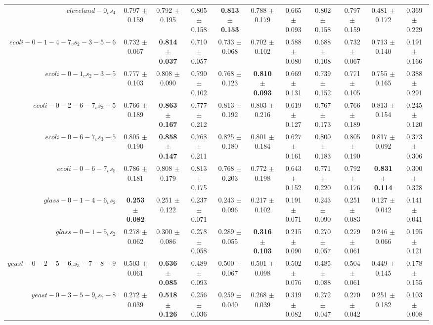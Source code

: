 \begin{table}[!ht]
{\begin{tabular}{r c c c c c c c c c c}
$cleveland-0_vs_4$ & 0.797 $\pm$ 0.159 & 0.792 $\pm$ 0.195 & 0.805 $\pm$ 0.158 & \textbf{0.813 $\pm$ 0.153} & 0.788 $\pm$ 0.179 & 0.665 $\pm$ 0.093 & 0.802 $\pm$ 0.158 & 0.797 $\pm$ 0.159 & 0.481 $\pm$ 0.172 & 0.369 $\pm$ 0.229 \\
$ecoli-0-1-4-7_vs_2-3-5-6$ & 0.732 $\pm$ 0.067 & \textbf{0.814 $\pm$ 0.037} & 0.710 $\pm$ 0.057 & 0.733 $\pm$ 0.068 & 0.702 $\pm$ 0.102 & 0.588 $\pm$ 0.080 & 0.688 $\pm$ 0.108 & 0.732 $\pm$ 0.067 & 0.713 $\pm$ 0.140 & 0.191 $\pm$ 0.166 \\
$ecoli-0-1_vs_2-3-5$ & 0.777 $\pm$ 0.103 & 0.808 $\pm$ 0.090 & 0.790 $\pm$ 0.102 & 0.768 $\pm$ 0.123 & \textbf{0.810 $\pm$ 0.093} & 0.669 $\pm$ 0.131 & 0.739 $\pm$ 0.152 & 0.771 $\pm$ 0.105 & 0.755 $\pm$ 0.165 & 0.388 $\pm$ 0.291 \\
$ecoli-0-2-6-7_vs_3-5$ & 0.766 $\pm$ 0.189 & \textbf{0.863 $\pm$ 0.167} & 0.777 $\pm$ 0.212 & 0.813 $\pm$ 0.192 & 0.803 $\pm$ 0.216 & 0.619 $\pm$ 0.127 & 0.767 $\pm$ 0.173 & 0.766 $\pm$ 0.189 & 0.813 $\pm$ 0.154 & 0.245 $\pm$ 0.120 \\
$ecoli-0-6-7_vs_3-5$ & 0.805 $\pm$ 0.190 & \textbf{0.858 $\pm$ 0.147} & 0.768 $\pm$ 0.211 & 0.825 $\pm$ 0.180 & 0.801 $\pm$ 0.184 & 0.627 $\pm$ 0.161 & 0.800 $\pm$ 0.183 & 0.805 $\pm$ 0.190 & 0.817 $\pm$ 0.092 & 0.373 $\pm$ 0.306 \\
$ecoli-0-6-7_vs_5$ & 0.786 $\pm$ 0.181 & 0.808 $\pm$ 0.179 & 0.813 $\pm$ 0.175 & 0.768 $\pm$ 0.203 & 0.772 $\pm$ 0.198 & 0.643 $\pm$ 0.152 & 0.771 $\pm$ 0.220 & 0.792 $\pm$ 0.176 & \textbf{0.831 $\pm$ 0.114} & 0.300 $\pm$ 0.328 \\
$glass-0-1-4-6_vs_2$ & \textbf{0.253 $\pm$ 0.082} & 0.251 $\pm$ 0.122 & 0.237 $\pm$ 0.071 & 0.243 $\pm$ 0.096 & 0.217 $\pm$ 0.102 & 0.191 $\pm$ 0.071 & 0.243 $\pm$ 0.090 & 0.251 $\pm$ 0.083 & 0.127 $\pm$ 0.042 & 0.141 $\pm$ 0.041 \\
$glass-0-1-5_vs_2$ & 0.278 $\pm$ 0.062 & 0.300 $\pm$ 0.086 & 0.278 $\pm$ 0.058 & 0.289 $\pm$ 0.055 & \textbf{0.316 $\pm$ 0.103} & 0.215 $\pm$ 0.090 & 0.270 $\pm$ 0.057 & 0.279 $\pm$ 0.061 & 0.246 $\pm$ 0.066 & 0.195 $\pm$ 0.121 \\
$yeast-0-2-5-6_vs_3-7-8-9$ & 0.503 $\pm$ 0.061 & \textbf{0.636 $\pm$ 0.085} & 0.489 $\pm$ 0.093 & 0.500 $\pm$ 0.067 & 0.501 $\pm$ 0.098 & 0.502 $\pm$ 0.076 & 0.485 $\pm$ 0.088 & 0.504 $\pm$ 0.061 & 0.449 $\pm$ 0.145 & 0.178 $\pm$ 0.155 \\
$yeast-0-3-5-9_vs_7-8$ & 0.272 $\pm$ 0.039 & \textbf{0.518 $\pm$ 0.126} & 0.256 $\pm$ 0.036 & 0.259 $\pm$ 0.040 & 0.268 $\pm$ 0.039 & 0.319 $\pm$ 0.082 & 0.272 $\pm$ 0.047 & 0.270 $\pm$ 0.042 & 0.251 $\pm$ 0.182 & 0.103 $\pm$ 0.008 \\

\end{tabular}}
\end{table}

